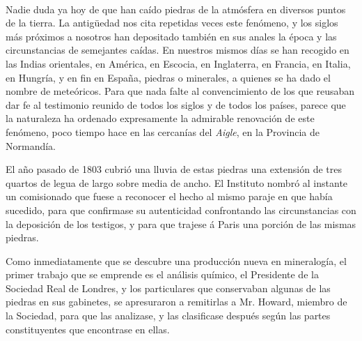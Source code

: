 \documentclass[a4paper, 11pt, oneside, polutonikogreek, spanish]{article}
\begin{document}
\paragraph{}
Nadie duda ya hoy de que han caído piedras de la atmósfera en diversos puntos de la tierra. La antigüedad nos cita repetidas veces este fenómeno, y los siglos más próximos a nosotros han depositado también en sus anales la época y las circunstancias de semejantes caídas. En nuestros mismos días se han recogido en las Indias orientales, en América, en Escocia, en Inglaterra, en Francia, en Italia, en Hungría, y en fin en España, piedras o minerales, a quienes se ha dado el nombre de meteóricos. Para que nada falte al convencimiento de los que reusaban dar fe al testimonio reunido de todos los siglos y de todos los países, parece que la naturaleza ha ordenado expresamente la admirable renovación de este fenómeno, poco tiempo hace en las cercanías del \emph{Aigle}, en la Provincia de Normandía.

El año pasado de 1803 cubrió una lluvia de estas piedras una extensión de tres quartos de legua de largo sobre media de ancho. El Instituto nombró al instante un comisionado que fuese a reconocer el hecho al mismo paraje en que había sucedido, para que confirmase su autenticidad confrontando las circunstancias con la deposición de los testigos, y para que trajese á Paris una porción de las mismas piedras.

Como inmediatamente que se descubre una producción nueva en mineralogía, el primer trabajo que se emprende es el análisis químico, el Presidente de la Sociedad Real de Londres, y los particulares que conservaban algunas de las piedras en sus gabinetes, se apresuraron a remitirlas a Mr. Howard, miembro de la Sociedad, para que las analizase, y las clasificase después según las partes constituyentes que encontrase en ellas.
\end{document}
